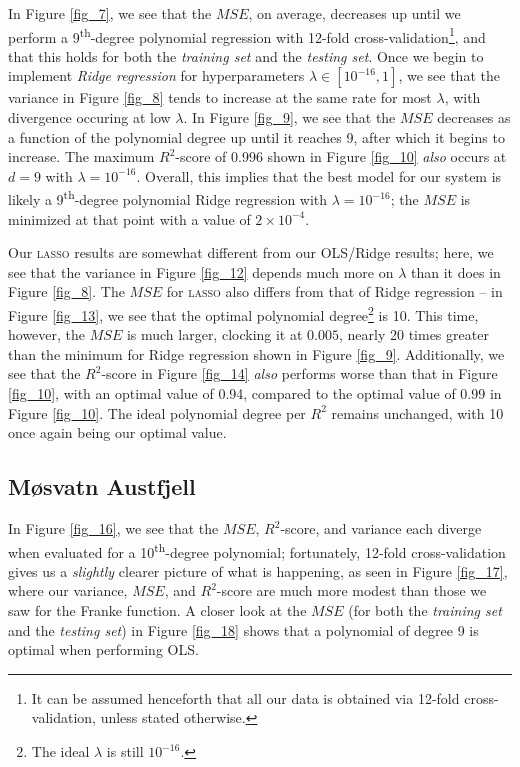 \documentclass[a4paper,10pt,english]{article}
\begin{document}
\begin{multicols*}{2}
In Figure \ref{fig_7}, we see that the $MSE$, on average, decreases up until we perform a 9\textsuperscript{th}-degree polynomial regression with 12-fold cross-validation\footnote{It can be assumed henceforth that all our data is obtained via 12-fold cross-validation, unless stated otherwise.}, and that this holds for both the \textit{training set} and the \textit{testing set}.  Once we begin to implement \textit{Ridge regression} for hyperparameters $\lambda \in [10^{-16}, 1]$, we see that the variance in Figure \ref{fig_8} tends to increase at the same rate for most $\lambda$, with divergence occuring at low $\lambda$. In Figure \ref{fig_9}, we see that the $MSE$ decreases as a function of the polynomial degree up until it reaches 9, after which it begins to increase. The maximum $R^2$-score of 0.996 shown in Figure \ref{fig_10} \textit{also} occurs at $d = 9$ with $\lambda = 10^{-16}$.  Overall, this implies that the best model for our system is likely a 9\textsuperscript{th}-degree polynomial Ridge regression with $\lambda = 10^{-16}$; the $MSE$ is minimized at that point with a value of $2 \times 10^{-4}$.

Our \textsc{lasso} results are somewhat different from our OLS/Ridge results; here, we see that the variance in Figure \ref{fig_12} depends much more on $\lambda$ than it does in Figure \ref{fig_8}.  The $MSE$ for \textsc{lasso} also differs from that of Ridge regression – in Figure \ref{fig_13}, we see that the optimal polynomial degree\footnote{The ideal $\lambda$ is still $10^{-16}$.} is 10. This time, however, the $MSE$ is much larger, clocking it at $0.005$, nearly 20 times greater than the minimum for Ridge regression shown in Figure \ref{fig_9}. Additionally, we see that the $R^2$-score in Figure \ref{fig_14} \textit{also} performs worse than that in Figure \ref{fig_10}, with an optimal value of 0.94, compared to the optimal value of 0.99 in Figure \ref{fig_10}.  The ideal polynomial degree per $R^2$ remains unchanged, with 10 once again being our optimal value.

\subsection*{Møsvatn Austfjell}

In Figure \ref{fig_16}, we see that the $MSE$, $R^2$-score, and variance each diverge when evaluated for a 10\textsuperscript{th}-degree polynomial; fortunately, 12-fold cross-validation gives us a \textit{slightly} clearer picture of what is happening, as seen in Figure \ref{fig_17}, where our variance, $MSE$, and $R^2$-score are much more modest than those we saw for the Franke function.  A closer look at the $MSE$ (for both the \textit{training set} and the \textit{testing set}) in Figure \ref{fig_18} shows that a polynomial of degree 9 is optimal when performing OLS.


\end{multicols*}
\end{document}
